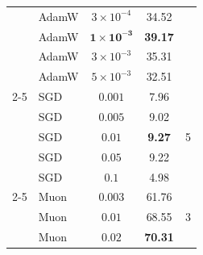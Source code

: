 \begin{table}[h]
{\begin{tabular}{llccc}
 & AdamW & $3 \times 10^{-4}$ & 34.52 & \\
 & AdamW & $\mathbf{1 \times 10^{-3}}$ & \textbf{39.17} & \\
 & AdamW & $3 \times 10^{-3}$ & 35.31 & \\
 & AdamW & $5 \times 10^{-3}$ & 32.51 & \\
\cmidrule(lr){2-5}
 & SGD & $0.001$ & 7.96 & \multirow{5}{*}{5} \\
 & SGD & $0.005$ & 9.02 & \\
 & SGD & $\mathbf{0.01}$ & \textbf{9.27} & \\
 & SGD & $0.05$ & 9.22 & \\
 & SGD & $0.1$ & 4.98 & \\
\cmidrule(lr){2-5}
 & Muon & $0.003$ & 61.76 & \multirow{3}{*}{3} \\
 & Muon & $0.01$ & 68.55 & \\
 & Muon & $\mathbf{0.02}$ & \textbf{70.31} & \\
\bottomrule
\end{tabular}%
}
\end{table}

